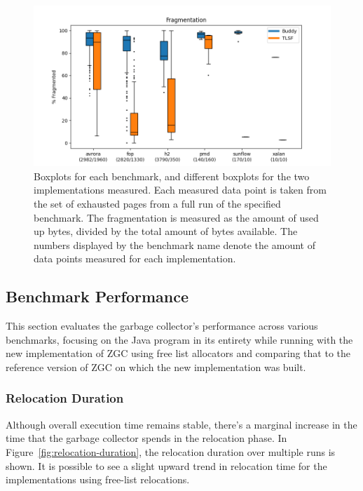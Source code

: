 \begin{figure}[H]
\centering
\includegraphics[width=1\textwidth]{figures/fl_fragmentation2.png}
\caption{Boxplots for each benchmark, and different boxplots for the two implementations measured. Each measured data point is taken from the set of exhausted pages from a full run of the specified benchmark. The fragmentation is measured as the amount of used up bytes, divided by the total amount of bytes available. The numbers displayed by the benchmark name denote the amount of data points measured for each implementation.}
\label{fig:memory-fragmentation}
\end{figure}

\subsection{Benchmark Performance}
This section evaluates the garbage collector's performance across various benchmarks, focusing on the Java program in its entirety while running with the new implementation of ZGC using free list allocators and comparing that to the reference version of ZGC on which the new implementation was built.


\subsubsection{Relocation Duration}

Although overall execution time remains stable, there's a marginal increase in the time that the garbage collector spends in the relocation phase. In Figure~\ref{fig:relocation-duration}, the relocation duration over multiple runs is shown. It is possible to see a slight upward trend in relocation time for the implementations using free-list relocations. 

